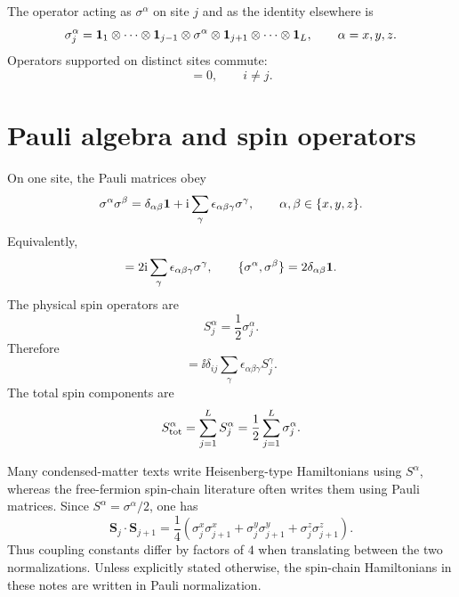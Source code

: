The operator acting as $\sigma^\alpha$ on site $j$ and as the identity elsewhere is
\begin{equation}
    \sigma_j^\alpha
    =
    \mathbf{1}_1\otimes\cdots\otimes\mathbf{1}_{j-1}
    \otimes\sigma^\alpha
    \otimes\mathbf{1}_{j+1}\otimes\cdots\otimes\mathbf{1}_L,
    \qquad
    \alpha=x,y,z.
\end{equation}
Operators supported on distinct sites commute:
\begin{equation}
    [\sigma_i^\alpha,\sigma_j^\beta]=0,
    \qquad
    i\neq j.
\end{equation}

\section{Pauli algebra and spin operators}

On one site, the Pauli matrices obey
\begin{equation}
\label{eq:pauli-product-algebra}
    \sigma^\alpha\sigma^\beta
    =
    \delta_{\alpha\beta}\mathbf{1}
    +
    \mathrm{i}\sum_{\gamma}\epsilon_{\alpha\beta\gamma}\sigma^\gamma,
    \qquad
    \alpha,\beta\in\{x,y,z\}.
\end{equation}
Equivalently,
\begin{equation}
    [\sigma^\alpha,\sigma^\beta]
    =
    2\ii\sum_\gamma\epsilon_{\alpha\beta\gamma}\sigma^\gamma,
    \qquad
    \{\sigma^\alpha,\sigma^\beta\}
    =
    2\delta_{\alpha\beta}\id .
\end{equation}
The physical spin operators are
\begin{equation}
    S^\alpha_j=\frac12\sigma^\alpha_j.
\end{equation}
Therefore
\begin{equation}
    [S_i^\alpha,S_j^\beta]
    =
    \ii\delta_{ij}
    \sum_\gamma\epsilon_{\alpha\beta\gamma}S_j^\gamma.
\end{equation}
The total spin components are
\begin{equation}
    S_{\rm tot}^\alpha
    =
    \sum_{j=1}^{L}S_j^\alpha
    =
    \frac12\sum_{j=1}^{L}\sigma_j^\alpha.
\end{equation}

\begin{remark}
Many condensed-matter texts write Heisenberg-type Hamiltonians using $S^\alpha$,
whereas the free-fermion spin-chain literature often writes them using Pauli
matrices. Since $S^\alpha=\sigma^\alpha/2$, one has
\begin{equation}
    \bm{S}_j\cdot\bm{S}_{j+1}
    =
    \frac14
    \left(
        \sigma_j^x\sigma_{j+1}^x
        +
        \sigma_j^y\sigma_{j+1}^y
        +
        \sigma_j^z\sigma_{j+1}^z
    \right).
\end{equation}
Thus coupling constants differ by factors of $4$ when translating between the two
normalizations. Unless explicitly stated otherwise, the spin-chain Hamiltonians in
these notes are written in Pauli normalization.
\end{remark}

